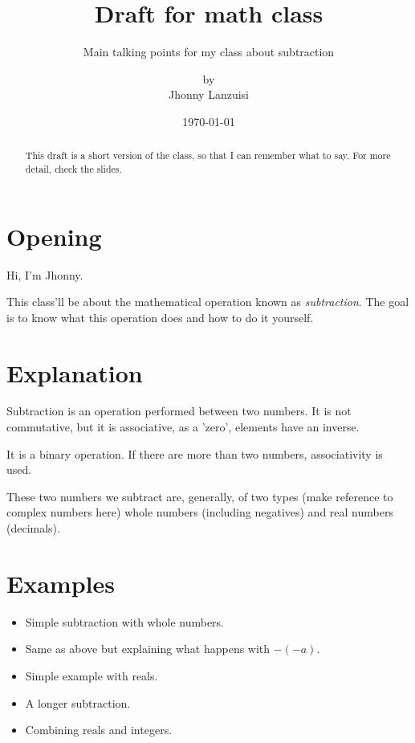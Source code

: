\documentclass{scrartcl}
\begin{document}
%
%
\title{Draft for math class}
\subtitle{Main talking points for my class about subtraction}
\subject{ID2131}
\titlehead{Universidad Simón Bolívar\hfill Caracas, Venezuela}
\author{by \\ Jhonny Lanzuisi}
\date{\today}
\maketitle

\begin{abstract}
  This draft is a short version of the class,
  so that I can remember what to say.
  For more detail, check the slides.
\end{abstract}

\section{Opening}
\label{sec:open}

Hi, I'm Jhonny.

This class'll be about the mathematical operation
known as \emph{subtraction}.
The goal is to know what this operation does and
how to do it yourself.

\section{Explanation}
\label{sec:expla}

Subtraction is an operation performed between two numbers.
It is not commutative, but it is associative, as a 'zero',
elements have an inverse.

It is a binary operation.
If there are more than two numbers,
associativity is used.

These two numbers we subtract are, generally,
of two types (make reference to complex numbers here)
whole numbers (including negatives) and
real numbers (decimals).

\section{Examples}
\label{sec:examp}

\begin{itemize}
\item Simple subtraction with whole numbers.
\item Same as above but explaining what happens with \(-(-a)\).
\item Simple example with reals.
\item A longer subtraction.
\item Combining reals and integers.
\end{itemize}
\end{document}
